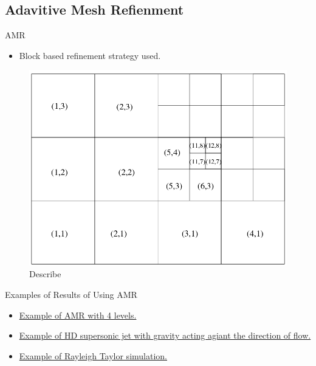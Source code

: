 \documentclass{beamer}
\begin{document}
\subsection{Adavitive Mesh Refienment}
\begin{frame}
\begin{block}{AMR}
\begin{itemize}
\item Block based refinement strategy used. 
\end{itemize}
\end{block}
\begin{figure}
\centering
\includegraphics[width=0.5\linewidth]{images/AMR_grid.png}
\caption{Describe}
\end{figure}
\end{frame}
\begin{frame}
\begin{block}{Examples of Results of Using AMR}
\begin{itemize}
\item \href{movies/AMR_example_2.avi}{Example of AMR with 4 levels.}
\item \href{movies/tracer_jet_g.avi}{Example of HD supersonic jet with gravity acting agiant the direction of flow.}
\item \href{movies/mov_one.avi}{Example of Rayleigh Taylor simulation.}
\end{itemize}
\end{block}
\end{frame}
\end{document}
